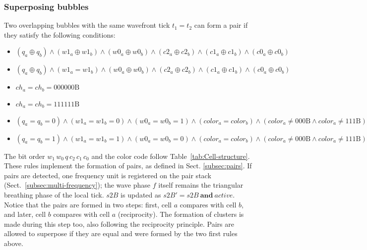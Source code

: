\documentclass[a4paper]{article}
\begin{document}
\subsubsection{Superposing bubbles}
Two overlapping bubbles with the same wavefront tick $t_1=t_2$ can form a pair if they satisfy the following conditions:
\begin{itemize}
\item
$ (q_a \oplus q_b) \land (w1_a \oplus w1_b) \land (w0_a \oplus w0_b) \land (c2_a \oplus c2_b) \land (c1_a \oplus c1_b) \land (c0_a \oplus c0_b) $
\item
$ (q_a \oplus q_b) \land (w1_a = w1_b) \land (w0_a \oplus w0_b) \land (c2_a \oplus c2_b) \land (c1_a \oplus c1_b) \land (c0_a \oplus c0_b) $
\item
$ ch_a = ch_b = 000000\mathrm{B} $
\item
$ ch_a = ch_b = 111111\mathrm{B} $
\item
$ (q_a = q_b = 0) \land (w1_a = w1_b = 0) \land (w0_a = w0_b = 1) \land (color_a = color_b) \land (color_a \neq 000\mathrm{B} \land color_a \neq 111\mathrm{B}) $
\item
$ (q_a = q_b = 1) \land (w1_a = w1_b = 1) \land (w0_a = w0_b = 0) \land (color_a = color_b) \land (color_a \neq 000\mathrm{B} \land color_a \neq 111\mathrm{B}) $
\end{itemize}
The bit order $w_{1}\,w_{0}\,q\,c_{2}\,c_{1}\,c_{0}$ and the color code follow Table~\ref{tab:Cell-structure}.
These rules implement the formation of pairs, as defined in Sect. \ref{subsec:pairs}.
If pairs are detected, one frequency unit is registered on the pair stack (Sect.~\ref{subsec:multi-frequency}); the wave phase $f$ itself remains the triangular breathing phase of the local tick.
$s2B$ is updated as $s2B' = s2B \ \textbf{and} \ \mathit{active}$.
Notice that the pairs are formed in two steps: first, cell $a$ compares with cell $b$, and later, cell $b$ compares with cell $a$ (reciprocity).
The formation of clusters is made during this step too, also following the reciprocity principle.
Pairs are allowed to superpose if they are equal and were formed by the two first rules above.
\end{document}
